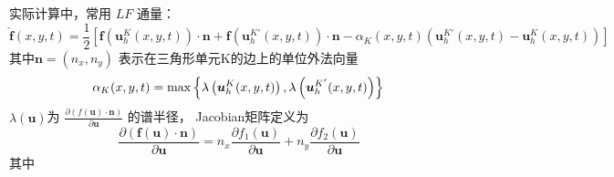 \documentclass[a4paper, 12pt, UTF8]{ctexart}
\newcommand{\bs}[1]{\boldsymbol{#1}}
\begin{document}
 实际计算中，常用 $LF$ 通量：
\begin{equation}
\hat{\bs f}(x, y, t)=\frac{1}{2}\left[\bs f({\bs u_{h}^{K}\left(x, y, t\right)}) \cdot \bs{n}+\bs f({\bs u_{h}^{K'}\left(x, y, t\right)}) \cdot \bs{n}-{\alpha_{K}(x, y, t)({\bs u_{h}^{K'}\left(x, y, t\right)}-{\bs u_{h}^{K}\left(x, y, t\right)})}\right]
\end{equation}
其中$\bs{n}=\left(n_{x}, n_{y}\right)$ 表示在三角形单元K的边上的单位外法向量
\begin{equation}\label{parameteralpha}
\alpha_{K}(x, y, t)=\max \left\{\lambda\left({\bs u}_{h}^K(x, y, t)\right), \lambda\left({\bs u}_h^{K'}(x, y, t)\right)\right\}\\
\end{equation}
 $\lambda\left(\bs{u}\right)$为 $\displaystyle \frac{\partial (f(\bs{u})\cdot \bs{n})}{\partial \bs{u}} $ 的谱半径，
Jacobian矩阵定义为
\begin{equation}
	\displaystyle \frac{\partial (\bs f(\bs{u})\cdot \bs{n})}{\partial \bs{u}} =n_x\frac{\partial f_1(\bs{u})}{\partial \bs{u}}+n_y\frac{\partial f_2(\bs{u})}{\partial \bs{u}}
\end{equation}
其中
\end{document}
